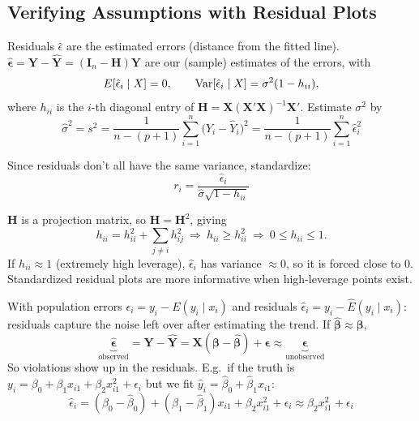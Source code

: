 \subsection{Verifying Assumptions with Residual Plots}\label{sec:residplots}

\begin{definition}[Residuals]
    Residuals $\hat{\epsilon}$ are the estimated errors (distance from the fitted line).
    $\hat{\boldsymbol\epsilon}=\mathbf{Y}-\hat{\mathbf{Y}}=(\mathbf{I}_n-\mathbf{H})\mathbf{Y}$
    are our (sample) estimates of the errors, with
    \[E[\hat\epsilon_i\mid X]=0, \qquad \operatorname{Var}[\hat\epsilon_i\mid X]=\sigma^2(1-h_{ii}),\]
    where $h_{ii}$ is the $i$-th diagonal entry of
    $\mathbf{H}=\mathbf{X}(\mathbf{X}'\mathbf{X})^{-1}\mathbf{X}'$.
     Estimate $\sigma^2$ by
    \[\hat\sigma^2 = s^2 = \frac{1}{n-(p+1)}\sum_{i=1}^n\big(Y_i-\hat Y_i\big)^2 = \frac{1}{n-(p+1)}\sum_{i=1}^n\hat\epsilon_i^2\]
\end{definition}

\begin{definition}
    Since residuals don't all have the same variance, standardize:
    \[r_i = \frac{\hat\epsilon_i}{\hat\sigma\sqrt{1-h_{ii}}}\]
\end{definition}

\begin{proposition}[$0\le h_{ii}\le1$]
    $\mathbf{H}$ is a projection matrix, so $\mathbf{H}=\mathbf{H}^2$, giving
    \[h_{ii}=h_{ii}^2+\sum_{j\neq i}h_{ij}^2 \ \Rightarrow\ h_{ii}\ge h_{ii}^2 \ \Rightarrow\ 0\le h_{ii}\le1.\]
    If $h_{ii}\approx1$ (extremely high leverage), $\hat\epsilon_i$ has
    variance $\approx0$, so it is forced close to 0.
    Standardized residual plots are more informative when high-leverage
    points exist. 
\end{proposition}

\begin{remark}
    With population errors $\epsilon_i=y_i-E(y_i\mid x_i)$ and residuals
    $\hat\epsilon_i=y_i-\hat E(y_i\mid x_i)$: residuals capture the noise
    left over after estimating the trend. If $\hat{\boldsymbol\beta}\approx\boldsymbol\beta$,
    \[\underbrace{\hat{\boldsymbol\epsilon}}_{\text{observed}}=\mathbf{Y}-\hat{\mathbf{Y}}=\mathbf{X}(\boldsymbol\beta-\hat{\boldsymbol\beta})+\boldsymbol\epsilon\approx\underbrace{\boldsymbol\epsilon}_{\text{unobserved}}\]
    So violations show up in the residuals. E.g.\ if the truth is
    $y_i=\beta_0+\beta_1x_{i1}+\beta_2x_{i1}^2+\epsilon_i$ but we fit
    $\hat y_i=\hat\beta_0+\hat\beta_1x_{i1}$:
    \[\hat\epsilon_i=(\beta_0-\hat\beta_0)+(\beta_1-\hat\beta_1)x_{i1}+\beta_2x_{i1}^2+\epsilon_i\approx\beta_2x_{i1}^2+\epsilon_i\]
\end{remark}

